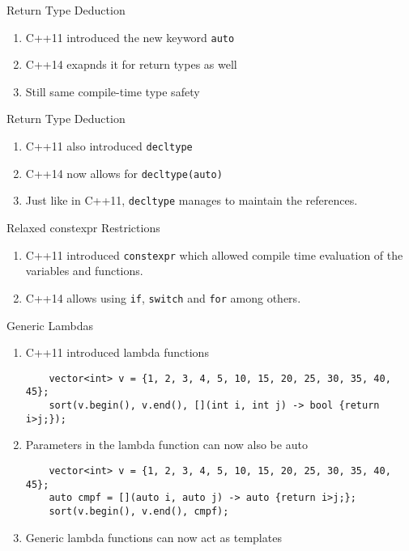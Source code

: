 \documentclass{beamer}
\begin{document}
\begin{frame}{Return Type Deduction}
\begin{enumerate}
  \item C++11 introduced the new keyword \texttt{auto}
  \item C++14 exapnds it for return types as well
  \item Still same compile-time type safety
\end{enumerate}
\end{frame}

\begin{frame}{Return Type Deduction}
 \begin{enumerate}
  \item C++11 also introduced \texttt{decltype}
  \item C++14 now allows for \texttt{decltype(auto)}
  \item Just like in C++11, \texttt{decltype} manages to maintain the references.
 \end{enumerate}
\end{frame}

\begin{frame}[fragile]{Relaxed constexpr Restrictions}
 \begin{enumerate}
  \item C++11 introduced \texttt{constexpr} which allowed compile time evaluation of the variables and functions.
  \item C++14 allows using \texttt{if}, \texttt{switch} and \texttt{for} among others.
 \end{enumerate}
\end{frame}


\begin{frame}[fragile]{Generic Lambdas}
 \begin{enumerate}
  \item C++11 introduced lambda functions
  \begin{lstlisting}
	vector<int> v = {1, 2, 3, 4, 5, 10, 15, 20, 25, 30, 35, 40, 45};
	sort(v.begin(), v.end(), [](int i, int j) -> bool {return i>j;});
  \end{lstlisting}
  \item Parameters in the lambda function can now also be auto
  \begin{lstlisting}
	vector<int> v = {1, 2, 3, 4, 5, 10, 15, 20, 25, 30, 35, 40, 45};
	auto cmpf = [](auto i, auto j) -> auto {return i>j;};
	sort(v.begin(), v.end(), cmpf);   
  \end{lstlisting}

  \item Generic lambda functions can now act as templates
 \end{enumerate}  
\end{frame}
\end{document}
